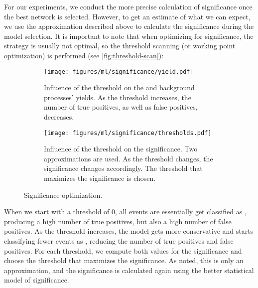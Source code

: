 For our experiments, we conduct the more precise calculation of significance once the best network is selected. However,
to get an estimate of what we can expect, we use the approximation described above to calculate the significance during
the model selection. It is important to note that when optimizing for significance, the \argmax strategy is usually not
optimal, so the threshold scanning (or working point optimization) is performed (see \autoref{fig:threshold-scan}):

\begin{figure}[htb]
    \centering
    \begin{subfigure}[t]{0.47\textwidth}
        \texttt{[image: figures/ml/significance/yield.pdf]}
        \caption[Influence of the threshold on the \tth and background processes' yields.]
        {Influence of the threshold on the \tth and background processes' yields. As the threshold increases,
            the number of true positives, as well as false positives, decreases.}
        \label{fig:signal-yield}
    \end{subfigure}
    \begin{subfigure}[t]{0.47\textwidth}
        \texttt{[image: figures/ml/significance/thresholds.pdf]}
        \caption[Influence of the threshold on the significance.]
        {Influence of the threshold on the significance. Two approximations are used. As the threshold changes, the
            significance changes accordingly. The threshold that maximizes the significance is chosen.}
        \label{fig:threshold-scan}
    \end{subfigure}
    \hfill
    \caption{Significance optimization.}
    \label{fig:significance-optimization}
\end{figure}

When we start with a threshold of 0, all events are essentially get classified as \tth, producing a high number of true
positives, but also a high number of false positives. As the threshold increases, the model gets more conservative and
starts classifying fewer events as \tth, reducing the number of true positives and false positives. For each threshold,
we compute both values for the significance and choose the threshold that maximizes the significance. As noted, this
is only an approximation, and the significance is calculated again using the better statistical model of significance.